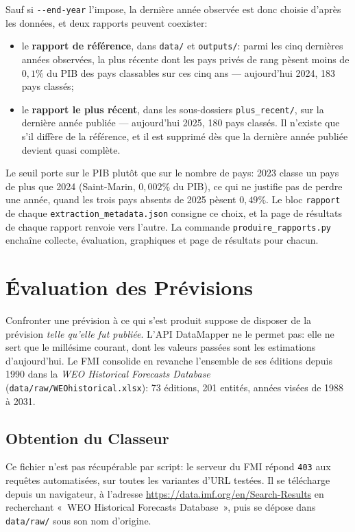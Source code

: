 \documentclass[11pt,a4paper]{article}
\begin{document}
Sauf si \texttt{-{}-end-year} l'impose, la dernière année observée est donc choisie d'après les données, et deux rapports peuvent coexister:
\begin{itemize}
    \item le \textbf{rapport de référence}, dans \texttt{data/} et \texttt{outputs/}: parmi les cinq dernières années observées, la plus récente dont les pays privés de rang pèsent moins de $0{,}1\%$ du PIB des pays classables sur ces cinq ans --- aujourd'hui 2024, 183 pays classés;
    \item le \textbf{rapport le plus récent}, dans les sous-dossiers \texttt{plus\_recent/}, sur la dernière année publiée --- aujourd'hui 2025, 180 pays classés. Il n'existe que s'il diffère de la référence, et il est supprimé dès que la dernière année publiée devient quasi complète.
\end{itemize}

Le seuil porte sur le PIB plutôt que sur le nombre de pays: 2023 classe un pays de plus que 2024 (Saint-Marin, $0{,}002\%$ du PIB), ce qui ne justifie pas de perdre une année, quand les trois pays absents de 2025 pèsent $0{,}49\%$. Le bloc \texttt{rapport} de chaque \texttt{extraction\_metadata.json} consigne ce choix, et la page de résultats de chaque rapport renvoie vers l'autre. La commande \texttt{produire\_rapports.py} enchaîne collecte, évaluation, graphiques et page de résultats pour chacun.

\section{Évaluation des Prévisions}\label{sec:evaluation}

Confronter une prévision à ce qui s'est produit suppose de disposer de la prévision \emph{telle qu'elle fut publiée}. L'API DataMapper ne le permet pas: elle ne sert que le millésime courant, dont les valeurs passées sont les estimations d'aujourd'hui. Le FMI consolide en revanche l'ensemble de ses éditions depuis 1990 dans la \textit{WEO Historical Forecasts Database} (\texttt{data/raw/WEOhistorical.xlsx}): 73 éditions, 201 entités, années visées de 1988 à 2031.

\subsection{Obtention du Classeur}
Ce fichier n'est pas récupérable par script: le serveur du FMI répond \texttt{403} aux requêtes automatisées, sur toutes les variantes d'URL testées. Il se télécharge depuis un navigateur, à l'adresse \url{https://data.imf.org/en/Search-Results} en recherchant «~WEO Historical Forecasts Database~», puis se dépose dans \texttt{data/raw/} sous son nom d'origine.
\end{document}
